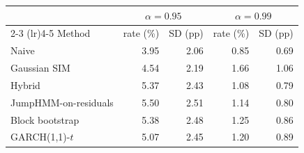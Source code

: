 \begin{tabular}{lrrrr}
\toprule
 & \multicolumn{2}{c}{$\alpha = 0.95$} & \multicolumn{2}{c}{$\alpha = 0.99$} \\
\cmidrule(lr){2-3} \cmidrule(lr){4-5}
Method & rate (\%) & SD (pp) & rate (\%) & SD (pp) \\
\midrule
Naive & 3.95 & 2.06 & 0.85 & 0.69 \\
Gaussian SIM & 4.54 & 2.19 & 1.66 & 1.06 \\
Hybrid & 5.37 & 2.43 & 1.08 & 0.79 \\
JumpHMM-on-residuals & 5.50 & 2.51 & 1.14 & 0.80 \\
Block bootstrap & 5.38 & 2.48 & 1.25 & 0.86 \\
GARCH(1,1)-$t$ & 5.07 & 2.45 & 1.20 & 0.89 \\
\bottomrule
\end{tabular}
